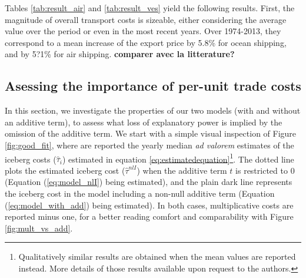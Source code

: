 \documentclass[a4paper,11pt]{article}
\begin{document}
Tables \ref{tab:result_air} and \ref{tab:result_ves} yield the following results. First, the magnitude of overall transport costs is sizeable, either considering the average value over the period or even in the most recent years. Over 1974-2013, they correspond to a mean increase of the export price by 5.8\% for ocean shipping, and by 5?1\% for air shipping. \textbf{comparer avec la litterature?}

\subsection{Asessing the importance of per-unit trade costs}
In this section, we investigate the properties of our two models (with and without an additive term), to assess what loss of explanatory power is implied by the omission of the additive term. We start with a simple visual inspection of Figure \ref{fig:good_fit}, where are reported the yearly median \emph{ad valorem} estimates of the iceberg costs ($\widehat{\tau}_{i}$) estimated in equation \ref{eq:estimatedequation}\footnote{Qualitatively similar results are obtained when the mean values are reported instead. More details of those results available upon request to the authors.}. The dotted line plots the estimated iceberg cost ($\widehat{\tau}^{nlI}$) when the additive term $t$ is restricted to 0 (Equation (\ref{eq:model_nlI}) being estimated), and the plain dark line represents the iceberg cost in the model including a non-null additive term (Equation (\ref{eq:model_with_add}) being estimated). In both cases, multiplicative costs are reported minus one, for a better reading comfort and comparability with Figure \ref{fig:mult_vs_add}.
\end{document}
